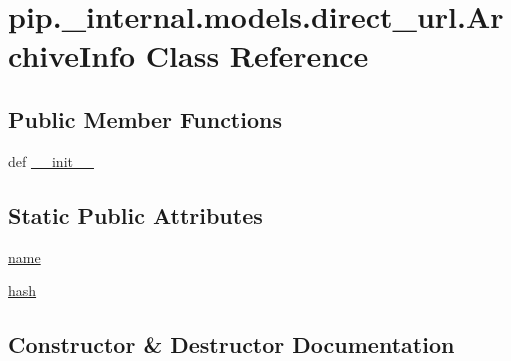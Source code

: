 \hypertarget{classpip_1_1__internal_1_1models_1_1direct__url_1_1ArchiveInfo}{}\section{pip.\+\_\+internal.\+models.\+direct\+\_\+url.\+Archive\+Info Class Reference}
\label{classpip_1_1__internal_1_1models_1_1direct__url_1_1ArchiveInfo}
\subsection*{Public Member Functions}
\begin{DoxyCompactItemize}
\item 
def \hyperlink{classpip_1_1__internal_1_1models_1_1direct__url_1_1ArchiveInfo_acd05c6d8738053b431611999e024ea40}{\+\_\+\+\_\+init\+\_\+\+\_\+}
\end{DoxyCompactItemize}
\subsection*{Static Public Attributes}
\begin{DoxyCompactItemize}
\item 
\hyperlink{classpip_1_1__internal_1_1models_1_1direct__url_1_1ArchiveInfo_a5983b3d67302d6c8600d17eff4c3d64d}{name}
\item 
\hyperlink{classpip_1_1__internal_1_1models_1_1direct__url_1_1ArchiveInfo_a1181a1c35af28cf9a06e2770c40a1fae}{hash}
\end{DoxyCompactItemize}


\subsection{Constructor \& Destructor Documentation}
\mbox{\label{classpip_1_1__internal_1_1models_1_1direct__url_1_1ArchiveInfo_acd05c6d8738053b431611999e024ea40}} 
